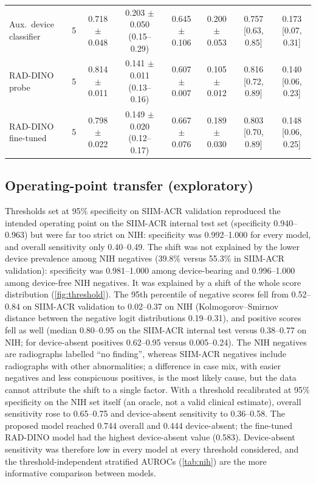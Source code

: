 \documentclass{ieeeaccess}
\newcommand{\ci}[2]{\scriptsize[#1, #2]}
\begin{document}
\begin{table}[!t]
\begin{tabular}{@{}l c c c c c c c@{}}
Aux.\ device classifier & 5 & 0.718 $\pm$ 0.048 & 0.203 $\pm$ 0.050 (0.15--0.29) & 0.645 $\pm$ 0.106 & 0.200 $\pm$ 0.053 & 0.757 \ci{0.63}{0.85} & 0.173 \ci{0.07}{0.31} \\
RAD-DINO probe & 5 & 0.814 $\pm$ 0.011 & 0.141 $\pm$ 0.011 (0.13--0.16) & 0.607 $\pm$ 0.007 & 0.105 $\pm$ 0.012 & 0.816 \ci{0.72}{0.89} & 0.140 \ci{0.06}{0.23} \\
RAD-DINO fine-tuned & 5 & 0.798 $\pm$ 0.022 & 0.149 $\pm$ 0.020 (0.12--0.17) & 0.667 $\pm$ 0.076 & 0.189 $\pm$ 0.030 & 0.803 \ci{0.70}{0.89} & 0.148 \ci{0.06}{0.25} \\
\bottomrule
\end{tabular}
\end{table}

\subsection{Operating-point transfer (exploratory)}
\label{sec:res-threshold}
Thresholds set at 95\% specificity on SIIM-ACR validation reproduced the intended operating point on the SIIM-ACR internal test set (specificity 0.940--0.963) but were far too strict on NIH: specificity was 0.992--1.000 for every model, and overall sensitivity only 0.40--0.49. The shift was not explained by the lower device prevalence among NIH negatives (39.8\% versus 55.3\% in SIIM-ACR validation): specificity was 0.981--1.000 among device-bearing and 0.996--1.000 among device-free NIH negatives. It was explained by a shift of the whole score distribution (\cref{fig:threshold}). The 95th percentile of negative scores fell from 0.52--0.84 on SIIM-ACR validation to 0.02--0.37 on NIH (Kolmogorov--Smirnov distance between the negative logit distributions 0.19--0.31), and positive scores fell as well (median 0.80--0.95 on the SIIM-ACR internal test versus 0.38--0.77 on NIH; for device-absent positives 0.62--0.95 versus 0.005--0.24). The NIH negatives are radiographs labelled ``no finding'', whereas SIIM-ACR negatives include radiographs with other abnormalities; a difference in case mix, with easier negatives and less conspicuous positives, is the most likely cause, but the data cannot attribute the shift to a single factor. With a threshold recalibrated at 95\% specificity on the NIH set itself (an oracle, not a valid clinical estimate), overall sensitivity rose to 0.65--0.75 and device-absent sensitivity to 0.36--0.58. The proposed model reached 0.744 overall and 0.444 device-absent; the fine-tuned RAD-DINO model had the highest device-absent value (0.583). Device-absent sensitivity was therefore low in every model at every threshold considered, and the threshold-independent stratified AUROCs (\cref{tab:nih}) are the more informative comparison between models.
\end{document}
